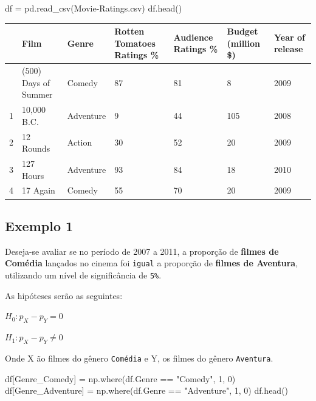 \documentclass[
  letterpaper,
  DIV=11,
  numbers=noendperiod]{scrreprt}
\newenvironment{Shaded}{\begin{snugshade}}{\end{snugshade}}
\newcommand{\DecValTok}[1]{\textcolor[rgb]{0.68,0.00,0.00}{#1}}
\newcommand{\NormalTok}[1]{\textcolor[rgb]{0.00,0.23,0.31}{#1}}
\newcommand{\OperatorTok}[1]{\textcolor[rgb]{0.37,0.37,0.37}{#1}}
\newcommand{\StringTok}[1]{\textcolor[rgb]{0.13,0.47,0.30}{#1}}
\begin{document}
\begin{Shaded}
\begin{Highlighting}[]
\NormalTok{df }\OperatorTok{=}\NormalTok{ pd.read\_csv(}\StringTok{\textquotesingle{}Movie{-}Ratings.csv\textquotesingle{}}\NormalTok{)}
\NormalTok{df.head()}
\end{Highlighting}
\end{Shaded}

\begin{longtable}[]{@{}lllllll@{}}
\toprule\noalign{}
& Film & Genre & Rotten Tomatoes Ratings \% & Audience Ratings \% &
Budget (million \$) & Year of release \\
\midrule\noalign{}
\endhead
\bottomrule\noalign{}
\endlastfoot
0 & (500) Days of Summer & Comedy & 87 & 81 & 8 & 2009 \\
1 & 10,000 B.C. & Adventure & 9 & 44 & 105 & 2008 \\
2 & 12 Rounds & Action & 30 & 52 & 20 & 2009 \\
3 & 127 Hours & Adventure & 93 & 84 & 18 & 2010 \\
4 & 17 Again & Comedy & 55 & 70 & 20 & 2009 \\
\end{longtable}

\hypertarget{exemplo-1-3}{%
\subsection{Exemplo 1}\label{exemplo-1-3}}

Deseja-se avaliar se no período de 2007 a 2011, a proporção de
\textbf{filmes de Comédia} lançados no cinema foi \texttt{igual} a
proporção de \textbf{filmes de Aventura}, utilizando um nível de
significância de \texttt{5\%}.

As hipóteses serão as seguintes:

\(H_{0} : p_{X} - p_{Y} = 0\)

\(H_{1} : p_{X} - p_{Y}\neq 0\)

Onde X ão filmes do gênero \texttt{Comédia} e Y, os filmes do gênero
\texttt{Aventura}.

\begin{Shaded}
\begin{Highlighting}[]
\NormalTok{df[}\StringTok{\textquotesingle{}Genre\_Comedy\textquotesingle{}}\NormalTok{] }\OperatorTok{=}\NormalTok{ np.where(df.Genre }\OperatorTok{==} \StringTok{"Comedy"}\NormalTok{, }\DecValTok{1}\NormalTok{, }\DecValTok{0}\NormalTok{)}
\NormalTok{df[}\StringTok{\textquotesingle{}Genre\_Adventure\textquotesingle{}}\NormalTok{] }\OperatorTok{=}\NormalTok{ np.where(df.Genre }\OperatorTok{==} \StringTok{"Adventure"}\NormalTok{, }\DecValTok{1}\NormalTok{, }\DecValTok{0}\NormalTok{)}
\NormalTok{df.head()}
\end{Highlighting}
\end{Shaded}
\end{document}
